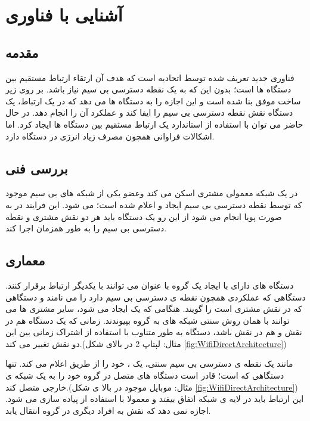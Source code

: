 \chapter{آشنایی با فناوری }
\thispagestyle{empty}

\section{مقدمه}
 فناوری جدید تعریف شده توسط اتحادیه 
  است که هدف آن ارتقاء ارتباط مستقیم بین دستگاه ها است؛ بدون این که به یک نقطه دسترسی بی سیم
   نیاز باشد.
بر روی زیر ساخت موفق 
بنا شده است و این اجازه را به دستگاه ها می دهد که در یک ارتباط، یک دستگاه نقش  نقطه دسترسی بی سیم را ایفا کند و عملکرد آن را انجام دهد. در حال حاضر می توان با استفاده از استاندارد 
یک ارتباط مستقیم بین دستگاه ها ایجاد کرد. اما اشکالات فراوانی همچون مصرف زیاد انرژی در دستگاه دارد.
 
\section{بررسی فنی}
 در یک شبکه معمولی 
مشتری
 اسکن می کند وعضو یکی  از شبکه های بی سیم موجود که توسط نقطه دسترسی بی سیم ایجاد و اعلام شده است؛ می شود. این فرایند در 
به صورت پویا
انجام می شود از این رو یک دستگاه 
باید هر دو نقش مشتری و نقطه دسترسی بی سیم را به طور همزمان اجرا کند.
\section{معماری}
دستگاه های دارای 
با ایجاد یک گروه با عنوان 
می توانند با یکدیگر ارتباط برقرار کنند. دستگاهی که عملکردی همچون نقطه ی دسترسی بی سیم دارد را 
می نامند و دستگاهی که در نقش مشتری است را 
گویند.
هنگامی که یک 
ایجاد می شود، سایر مشتری ها می توانند با همان روش سنتی شبکه های 
به گروه بپیوندند. زمانی که یک دستگاه هم در نقش 
 و هم در نقش 
باشد، دستگاه به طور متناوب با استفاده از اشتراک زمانی 
بین این دو نقش تغییر می کند.(مثال: لپتاپ 2 در بالای شکل \ref{fig:WifiDirectArchitecture})

 مانند یک نقطه ی دسترسی بی سیم سنتی، یک
، خود را از طریق 
  اعلام می کند. تنها دستگاهی که 
 است؛ قادر است دستگاه های متصل در گروه خود را به یک شبکه ی خارجی متصل کند.(مثال: موبایل موجود در بالا ی شکل \ref{fig:WifiDirectArchitecture}) این ارتباط باید در لایه ی شبکه 
اتفاق بیفتد و معمولا با استفاده از 
پیاده سازی می شود.
اجازه نمی دهد که نقش 
به افراد دیگری در گروه انتقال یابد.

